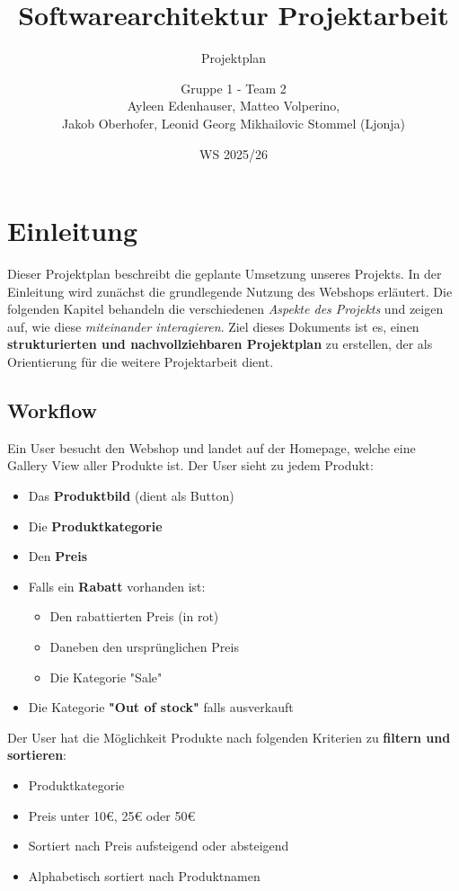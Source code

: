 \documentclass[12pt, a4paper]{scrreprt}
\title{Softwarearchitektur Projektarbeit}
\subtitle{Projektplan}
\author{Gruppe 1 - Team 2\\Ayleen Edenhauser, Matteo Volperino,\\Jakob Oberhofer, Leonid Georg Mikhailovic Stommel (Ljonja)}
\date{WS 2025/26}
\begin{document}
	
	\maketitle
		
	\tableofcontents
	
	\chapter{Einleitung}
	
	Dieser Projektplan beschreibt die geplante Umsetzung unseres Projekts. In der Einleitung wird zunächst die grundlegende Nutzung des Webshops erläutert. Die folgenden Kapitel behandeln die verschiedenen \textit{Aspekte des Projekts} und zeigen auf, wie diese \textit{miteinander interagieren}. Ziel dieses Dokuments ist es, einen \textbf{strukturierten und nachvollziehbaren Projektplan} zu erstellen, der als Orientierung für die weitere Projektarbeit dient.

		\section{Workflow}
		
		Ein User besucht den Webshop und landet auf der Homepage, welche eine Gallery View aller Produkte ist. Der User sieht zu jedem Produkt:
		\begin{itemize}
			\item Das \textbf{Produktbild} (dient als Button)
			\item Die \textbf{Produktkategorie} 
			\item Den \textbf{Preis}
			\item Falls ein \textbf{Rabatt} vorhanden ist:
				\begin{itemize}
					\item Den rabattierten Preis (in rot)
					\item Daneben den ursprünglichen Preis
					\item Die Kategorie "Sale"
				\end{itemize}
			\item Die Kategorie \textbf{"Out of stock"} falls ausverkauft
		\end{itemize}
		
		Der User hat die Möglichkeit Produkte nach folgenden Kriterien zu \textbf{filtern und sortieren}:
		\begin{itemize}
			\item Produktkategorie
			\item Preis unter 10€, 25€ oder 50€
			\item Sortiert nach Preis aufsteigend oder absteigend
			\item Alphabetisch sortiert nach Produktnamen
		\end{itemize}
		
\end{document}
